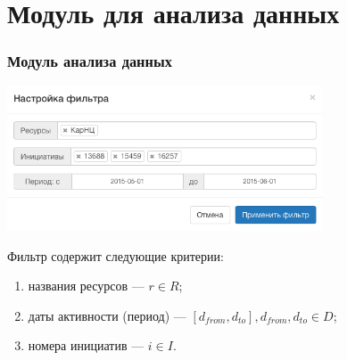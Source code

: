 \documentclass{beamer}
\begin{document}
\section{Модуль для анализа данных}

\begin{frame}
\frametitle{Модуль анализа данных}
\vspace{0.5cm}
\includegraphics[width=0.7\textwidth]{images/filter}

Фильтр содержит следующие критерии:
\begin{enumerate}
  \item названия ресурсов --- $r \in R$;
  \item даты активности (период) --- $[d_{from}, d_{to}], d_{from}, d_{to} \in D$;
  \item номера инициатив --- $i \in I$.
\end{enumerate}
\end{frame}
\end{document}
